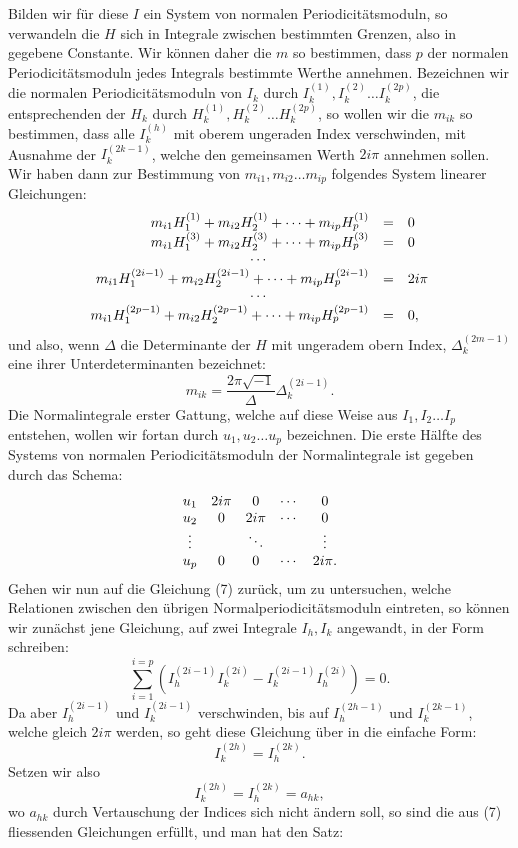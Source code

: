 \documentclass[10pt]{article}
\begin{document}
Bilden wir für diese \(I\) ein System von normalen Periodicitätsmoduln, so verwandeln die \(H\) sich in Integrale zwischen bestimmten Grenzen, also in gegebene Constante. Wir können daher die \(m\) so bestimmen, dass \(p\) der normalen Periodicitätsmoduln jedes Integrals bestimmte Werthe annehmen. Bezeichnen wir die normalen Periodicitätsmoduln von \(I_k\) durch \(I_k^{(1)}, I_k^{(2)}\ldots I_k^{(2p)}\), die entsprechenden der \(H_k\) durch \(H_k^{(1)}, H_k^{(2)}\ldots H_k^{(2p)}\), so wollen wir die \(m_{ik}\) so bestimmen, dass alle \(I_k^{(h)}\) mit oberem ungeraden Index verschwinden, mit Ausnahme der \(I_k^{(2k-1)}\), welche den gemeinsamen Werth \(2i\pi\) annehmen sollen. Wir haben dann zur Bestimmung von \(m_{i1},m_{i2}\ldots m_{ip}\) folgendes System linearer Gleichungen:
\[
\begin{array}{rcl}
m_{i1}H_1^{(1)}+m_{i2}H_2^{(1)}+\cdots+m_{ip}H_p^{(1)}&=&0\\
m_{i1}H_1^{(3)}+m_{i2}H_2^{(3)}+\cdots+m_{ip}H_p^{(3)}&=&0\\
\multicolumn{3}{c}{\cdots}\\
m_{i1}H_1^{(2i-1)}+m_{i2}H_2^{(2i-1)}+\cdots+m_{ip}H_p^{(2i-1)}&=&2i\pi\\
\multicolumn{3}{c}{\cdots}\\
m_{i1}H_1^{(2p-1)}+m_{i2}H_2^{(2p-1)}+\cdots+m_{ip}H_p^{(2p-1)}&=&0,
\end{array}
\]
und also, wenn \(\Delta\) die Determinante der \(H\) mit ungeradem obern Index, \(\Delta_k^{(2m-1)}\) eine ihrer Unterdeterminanten bezeichnet:
\[
m_{ik}=\frac{2\pi\sqrt{-1}}{\Delta}\Delta_k^{(2i-1)}.
\]
Die Normalintegrale erster Gattung, welche auf diese Weise aus \(I_1,I_2\ldots I_p\) entstehen, wollen wir fortan durch \(u_1,u_2\ldots u_p\) bezeichnen. Die erste Hälfte des Systems von normalen Periodicitätsmoduln der Normalintegrale ist gegeben durch das Schema:
\[
\begin{array}{c@{\quad}cccc}
u_1&2i\pi&0&\cdots&0\\
u_2&0&2i\pi&\cdots&0\\
\vdots&&\ddots&&\vdots\\
u_p&0&0&\cdots&2i\pi.
\end{array}
\]
Gehen wir nun auf die Gleichung (7) zurück, um zu untersuchen, welche Relationen zwischen den übrigen Normalperiodicitätsmoduln eintreten, so können wir zunächst jene Gleichung, auf zwei Integrale \(I_h,I_k\) angewandt, in der Form schreiben:
\[
\sum_{i=1}^{i=p}\left(I_h^{(2i-1)}I_k^{(2i)}-I_k^{(2i-1)}I_h^{(2i)}\right)=0.
\]
Da aber \(I_h^{(2i-1)}\) und \(I_k^{(2i-1)}\) verschwinden, bis auf \(I_h^{(2h-1)}\) und \(I_k^{(2k-1)}\), welche gleich \(2i\pi\) werden, so geht diese Gleichung über in die einfache Form:
\[
I_k^{(2h)}=I_h^{(2k)}.
\]
Setzen wir also
\[
I_k^{(2h)}=I_h^{(2k)}=a_{hk},
\]
wo \(a_{hk}\) durch Vertauschung der Indices sich nicht ändern soll, so sind die aus (7) fliessenden Gleichungen erfüllt, und man hat den Satz:
\end{document}
